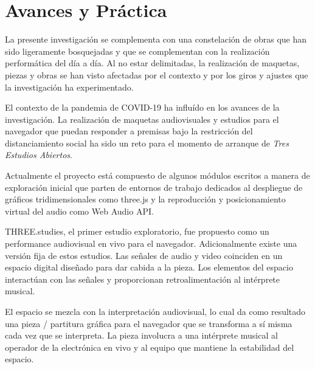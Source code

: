 \section*{Avances y Práctica}

La presente investigación se complementa con una constelación de obras que han sido ligeramente bosquejadas y que se complementan con la realización performática del día a día. Al no estar delimitadas, la realización de maquetas, piezas y obras se han visto afectadas por el contexto y por los giros y ajustes que la investigación ha experimentado. 

El contexto de la pandemia de COVID-19 ha influído en los avances de la investigación. La realización de maquetas audiovisuales y estudios para el navegador que puedan responder a premisas bajo la restricción del distanciamiento social ha sido un reto para el momento de arranque de \textit{Tres Estudios Abiertos}. 

Actualmente el proyecto está compuesto de algunos módulos escritos a manera de exploración inicial que parten de entornos de trabajo dedicados al despliegue de gráficos tridimensionales como three.js y la reproducción y posicionamiento virtual del audio como Web Audio API. 




THREE.studies, el primer estudio exploratorio, fue propuesto como un performance audiovisual en vivo para el navegador. Adicionalmente existe una versión fija de estos estudios. Las señales de audio y video coinciden en un espacio digital diseñado para dar cabida a la pieza. Los elementos del espacio interactúan con las señales y proporcionan retroalimentación al intérprete musical.

El espacio se mezcla con la interpretación audiovisual, lo cual da como resultado una pieza / partitura gráfica para el navegador que se transforma a sí misma cada vez que se interpreta. La pieza involucra a una intérprete musical al operador de la electrónica en vivo y al equipo que mantiene la estabilidad del espacio. 

